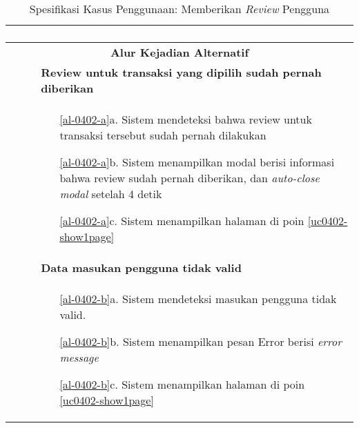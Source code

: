 \begin{table}[H]
\begin{tabular}{|r|p{8cm}|}
\begin{enumerate}
			\end{enumerate}
			\\ \hline
			\multicolumn{2}{|c|}{\textbf{Alur Kejadian Alternatif}} \\ \hline
			\multicolumn{1}{|l|}{}                                   \pagebreak        
			& \textbf{Review untuk transaksi yang dipilih sudah pernah diberikan}
			\\ \hline
			\multicolumn{1}{|l|}{}& 
			\begin{itemize}
				\item[\ref{al-0402-a}a.] Sistem mendeteksi bahwa review untuk transaksi tersebut sudah pernah dilakukan
				\item[\ref{al-0402-a}b.] Sistem menampilkan modal berisi informasi bahwa review sudah pernah diberikan, dan \textit{auto-close modal} setelah 4 detik
				\item[\ref{al-0402-a}c.] Sistem menampilkan halaman di poin \ref{uc0402-show1page}
			\end{itemize}
			\\ \hline
			
			\multicolumn{1}{|l|}{}      
			& \textbf{Data masukan pengguna tidak valid}
			\\ \hline
			\multicolumn{1}{|l|}{}& 
			\begin{itemize}
				\item[\ref{al-0402-b}a.] Sistem mendeteksi masukan pengguna tidak valid.
				\item[\ref{al-0402-b}b.] Sistem menampilkan pesan Error berisi \textit{error message}
				\item[\ref{al-0402-b}c.] Sistem menampilkan halaman di poin \ref{uc0402-show1page}
			\end{itemize}
			\\ \hline
		\end{tabular}
		\caption{Spesifikasi Kasus Penggunaan: Memberikan \textit{Review} Pengguna}
		\label{uc04.02}
	\end{table}